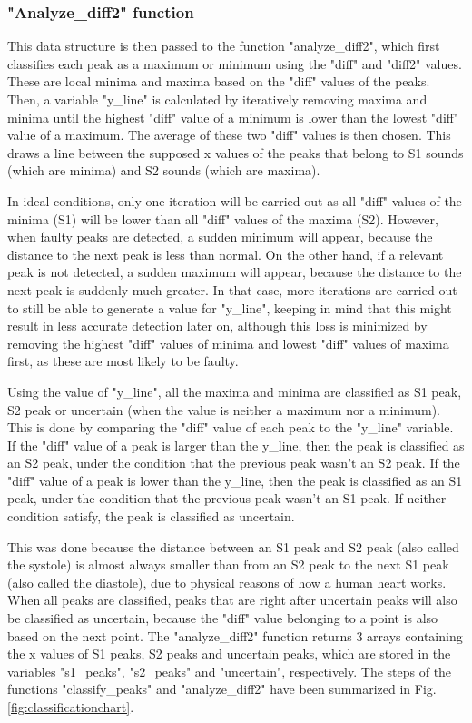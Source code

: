\subsubsection{"Analyze\_diff2" function}
This data structure is then passed to the function "analyze\_diff2", which first classifies each peak as a maximum or minimum using the "diff" and "diff2" values. These are local minima and maxima based on the "diff" values of the peaks. Then, a variable "y\_line" is calculated by iteratively removing maxima and minima until the highest "diff" value of a minimum is lower than the lowest "diff" value of a maximum. The average of these two "diff" values is then chosen. This draws a line between the supposed x values of the peaks that belong to S1 sounds (which are minima) and S2 sounds (which are maxima).

In ideal conditions, only one iteration will be carried out as all "diff" values of the minima (S1) will be lower than all "diff" values of the maxima (S2). However, when faulty peaks are detected, a sudden minimum will appear, because the distance to the next peak is less than normal. On the other hand, if a relevant peak is not detected, a sudden maximum will appear, because the distance to the next peak is suddenly much greater. In that case, more iterations are carried out to still be able to generate a value for "y\_line", keeping in mind that this might result in less accurate detection later on, although this loss is minimized by removing the highest "diff" values of minima and lowest "diff" values of maxima first, as these are most likely to be faulty.

Using the value of "y\_line", all the maxima and minima are classified as S1 peak, S2 peak or uncertain (when the value is neither a maximum nor a minimum). This is done by comparing the "diff" value of each peak to the "y\_line" variable. If the "diff" value of a peak is larger than the y\_line, then the peak is classified as an S2 peak, under the condition that the previous peak wasn't an S2 peak. If the "diff" value of a peak is lower than the y\_line, then the peak is classified as an S1 peak, under the condition that the previous peak wasn't an S1 peak. If neither condition satisfy, the peak is classified as uncertain.

This was done because the distance between an S1 peak and S2 peak (also called the systole) is almost always smaller than from an S2 peak to the next S1 peak (also called the diastole), due to physical reasons of how a human heart works. When all peaks are classified, peaks that are right after uncertain peaks will also be classified as uncertain, because the "diff" value belonging to a point is also based on the next point. The "analyze\_diff2" function returns 3 arrays containing the x values of S1 peaks, S2 peaks and uncertain peaks, which are stored in the variables "s1\_peaks", "s2\_peaks" and "uncertain", respectively. The steps of the functions "classify\_peaks" and "analyze\_diff2" have been summarized in Fig. \ref{fig:classificationchart}.

